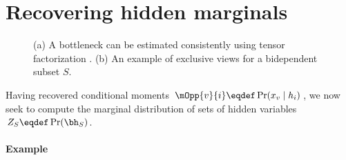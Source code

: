 \section{Recovering hidden marginals}
\label{sec:hiddenMarginals}

\begin{figure}
  \centering
  \hspace{2em}

  \caption{
    \label{fig:bottleneckExclusiveViews}
  (a) A bottleneck can be estimated consistently
  using tensor factorization \citep{anandkumar13tensor}.
  (b) An example of exclusive views for a bidependent subset $S$.
  }
\end{figure}

Having recovered conditional moments $\mOpp{v}{i} \eqdef \Pr(x_v \mid h_i)$,
we now seek to compute the marginal distribution of sets of hidden variables
$Z_S \eqdef \Pr(\bh_S)$.


\paragraph{Example}

